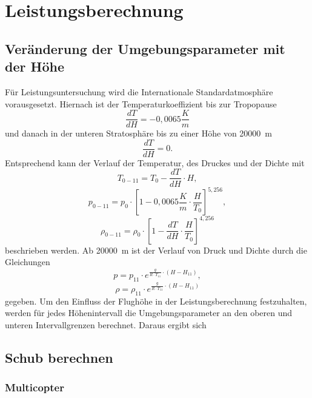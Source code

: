 \section{Leistungsberechnung}
\label{sec:leistungsberechnung}
\subsection{Veränderung der Umgebungsparameter mit der Höhe}
Für Leistungsuntersuchung wird die Internationale Standardatmosphäre vorausgesetzt. Hiernach ist der Temperaturkoeffizient bis zur Tropopause
\begin{equation}
	\frac{dT}{dH} = -0,0065\frac{K}{m}
\end{equation}
und danach in der unteren Stratosphäre bis zu einer Höhe von \SI{20000}{m}
\begin{equation}
	\frac{dT}{dH} = 0.
\end{equation}
Entsprechend kann der Verlauf der Temperatur, des Druckes und der Dichte mit
\begin{equation}
	T_{0-11} = T_0 - \frac{dT}{dH}\cdot H,
\end{equation}
\begin{equation}
	p_{0-11} = p_0\cdot [1-0,0065\frac{K}{m}\cdot \frac{H}{T_0}]^{5,256},
\end{equation}
\begin{equation}
	\rho_{0-11} = \rho_0 \cdot [1-\frac{dT}{dH}\cdot \frac{H}{T_0}]^{4,256}
\end{equation}
beschrieben werden. Ab \SI{20000}{m} ist der Verlauf von Druck und Dichte durch die Gleichungen
\begin{equation}
	p = p_{11}\cdot e^{\frac{g}{R\cdot T_{11}}\cdot (H-H_{11})},
\end{equation} 
\begin{equation}
	\rho = \rho_{11}\cdot e^{\frac{g}{R\cdot T_{11}}\cdot (H-H_{11})}
\end{equation}
gegeben.
Um den Einfluss der Flughöhe in der Leistungsberechnung festzuhalten, werden für jedes Höhenintervall die Umgebungsparameter an den oberen und unteren Intervallgrenzen berechnet. Daraus ergibt sich  

\subsection{Schub berechnen}
\subsubsection{Multicopter}

